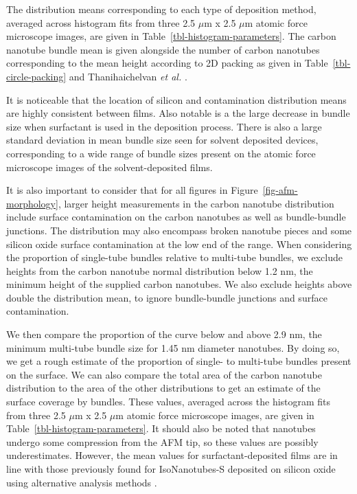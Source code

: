 \documentclass[
  a4paper,
]{scrbook}
\begin{document}
The distribution means corresponding to each type of deposition method,
averaged across histogram fits from three 2.5 \(\mu\)m x 2.5 \(\mu\)m
atomic force microscope images, are given in
Table~\ref{tbl-histogram-parameters}. The carbon nanotube bundle mean is
given alongside the number of carbon nanotubes corresponding to the mean
height according to 2D packing as given in
Table~\ref{tbl-circle-packing} and Thanihaichelvan \emph{et al.}
\autocite{Thanihaichelvan2018}.

It is noticeable that the location of silicon and contamination
distribution means are highly consistent between films. Also notable is
a the large decrease in bundle size when surfactant is used in the
deposition process. There is also a large standard deviation in mean
bundle size seen for solvent deposited devices, corresponding to a wide
range of bundle sizes present on the atomic force microscope images of
the solvent-deposited films.

It is also important to consider that for all figures in
Figure~\ref{fig-afm-morphology}, larger height measurements in the
carbon nanotube distribution include surface contamination on the carbon
nanotubes as well as bundle-bundle junctions. The distribution may also
encompass broken nanotube pieces and some silicon oxide surface
contamination at the low end of the range. When considering the
proportion of single-tube bundles relative to multi-tube bundles, we
exclude heights from the carbon nanotube normal distribution below 1.2
nm, the minimum height of the supplied carbon nanotubes. We also exclude
heights above double the distribution mean, to ignore bundle-bundle
junctions and surface contamination.

We then compare the proportion of the curve below and above 2.9 nm, the
minimum multi-tube bundle size for 1.45 nm diameter nanotubes. By doing
so, we get a rough estimate of the proportion of single- to multi-tube
bundles present on the surface. We can also compare the total area of
the carbon nanotube distribution to the area of the other distributions
to get an estimate of the surface coverage by bundles. These values,
averaged across the histogram fits from three 2.5 \(\mu\)m x 2.5
\(\mu\)m atomic force microscope images, are given in
Table~\ref{tbl-histogram-parameters}. It should also be noted that
nanotubes undergo some compression from the AFM tip, so these values are
possibly underestimates. However, the mean values for
surfactant-deposited films are in line with those previously found for
IsoNanotubes-S deposited on silicon oxide using alternative analysis
methods \autocite{Vobornik2023}.
\end{document}
